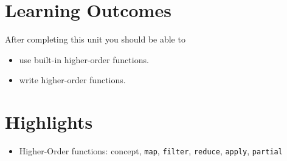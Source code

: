 \documentclass[11pt,a4paper]{article}
\begin{document}
\section{Learning Outcomes}

After completing this unit you should be able to

\begin{itemize}
    \item use built-in higher-order functions.
    \item write higher-order functions.
\end{itemize}

\section{Highlights}

\begin{itemize}
    \item Higher-Order functions: concept, \verb|map|, \verb|filter|, \verb|reduce|, \verb|apply|, \verb|partial|
\end{itemize}
\end{document}
